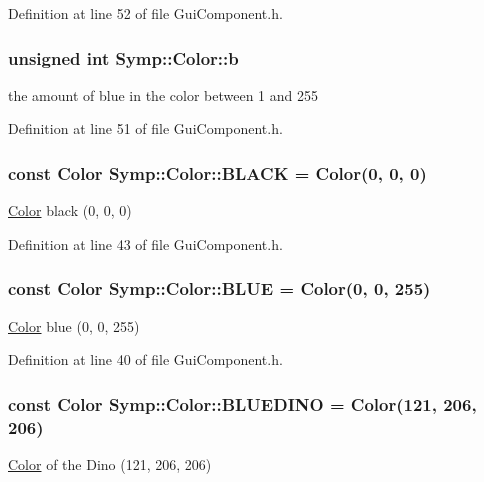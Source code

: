 Definition at line 52 of file Gui\-Component.\-h.

\hypertarget{struct_symp_1_1_color_a71b5f200ef4f3b72ab507bc9cd41e8cc}{
\subsubsection[{b}]{\setlength{\rightskip}{0pt plus 5cm}unsigned int Symp\-::\-Color\-::b}}\label{struct_symp_1_1_color_a71b5f200ef4f3b72ab507bc9cd41e8cc}
the amount of blue in the color between 1 and 255 

Definition at line 51 of file Gui\-Component.\-h.

\hypertarget{struct_symp_1_1_color_a8a38032122222aad1e32aae688d27a23}{
\subsubsection[{B\-L\-A\-C\-K}]{\setlength{\rightskip}{0pt plus 5cm}const {\bf Color} Symp\-::\-Color\-::\-B\-L\-A\-C\-K = {\bf Color}(0, 0, 0)\hspace{0.3cm}{\ttfamily [static]}}}\label{struct_symp_1_1_color_a8a38032122222aad1e32aae688d27a23}
\hyperlink{struct_symp_1_1_color}{Color} black (0, 0, 0) 

Definition at line 43 of file Gui\-Component.\-h.

\hypertarget{struct_symp_1_1_color_a8585c0abfc6ae44172bcbc7e1bbc54bf}{
\subsubsection[{B\-L\-U\-E}]{\setlength{\rightskip}{0pt plus 5cm}const {\bf Color} Symp\-::\-Color\-::\-B\-L\-U\-E = {\bf Color}(0, 0, 255)\hspace{0.3cm}{\ttfamily [static]}}}\label{struct_symp_1_1_color_a8585c0abfc6ae44172bcbc7e1bbc54bf}
\hyperlink{struct_symp_1_1_color}{Color} blue (0, 0, 255) 

Definition at line 40 of file Gui\-Component.\-h.

\hypertarget{struct_symp_1_1_color_aaeb71736387c37c7df2b0ea9b0cc6417}{
\subsubsection[{B\-L\-U\-E\-D\-I\-N\-O}]{\setlength{\rightskip}{0pt plus 5cm}const {\bf Color} Symp\-::\-Color\-::\-B\-L\-U\-E\-D\-I\-N\-O = {\bf Color}(121, 206, 206)\hspace{0.3cm}{\ttfamily [static]}}}\label{struct_symp_1_1_color_aaeb71736387c37c7df2b0ea9b0cc6417}
\hyperlink{struct_symp_1_1_color}{Color} of the Dino (121, 206, 206) 


